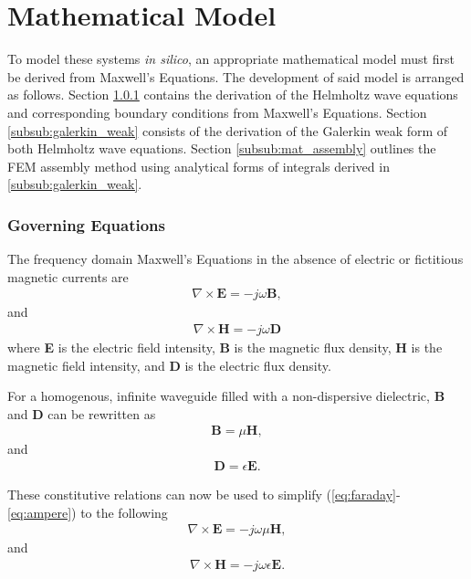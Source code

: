 \section{Mathematical Model}
\label{sec:mathmod}

To model these systems \textit{in silico}, an appropriate mathematical model must first be derived from Maxwell's Equations. The development of said model is arranged as follows. Section \ref{subsub:goveq} contains the derivation of the Helmholtz wave equations and corresponding boundary conditions from Maxwell's Equations. Section \ref{subsub:galerkin_weak} consists of the derivation of the Galerkin weak form of both Helmholtz wave equations. Section \ref{subsub:mat_assembly} outlines the FEM assembly method using analytical forms of integrals derived in \ref{subsub:galerkin_weak}.

\subsubsection{Governing Equations}
\label{subsub:goveq}

The frequency domain Maxwell's Equations in the absence of electric or fictitious magnetic currents are
\begin{align}
	\nabla \times \textbf{E} = -j\omega\textbf{B},
	\label{eq:faraday}
\end{align}
and
\begin{align}
	\nabla \times \textbf{H} = -j\omega\textbf{D}
	\label{eq:ampere}
\end{align}
where \textbf{E} is the electric field intensity, \textbf{B} is the magnetic flux density, \textbf{H} is the magnetic field intensity, and \textbf{D} is the electric flux density.

For a homogenous, infinite waveguide filled with a non-dispersive dielectric, \textbf{B} and \textbf{D} can be rewritten as
\begin{align}
	\textbf{B} = \mu \textbf{H},
	\label{eq:corH}
\end{align}
and
\begin{align}
	\textbf{D} = \epsilon \textbf{E}.
	\label{eq:corE}
\end{align}

These constitutive relations can now be used to simplify (\ref{eq:faraday}-\ref{eq:ampere}) to the following
\begin{align}
	\nabla \times \textbf{E} = -j\omega\mu\textbf{H},
	\label{eq:faraday_reduced}
\end{align}
and
\begin{align}
	\nabla \times \textbf{H} = -j\omega\epsilon\textbf{E}.
	\label{eq:ampere_reduced}
\end{align}

